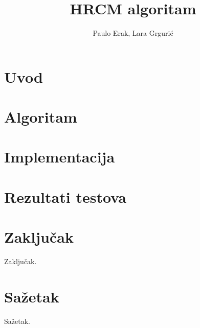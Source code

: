 \documentclass[times, utf8, seminar]{fer}
\begin{document}
\title{HRCM algoritam}

\author{Paulo Erak, Lara Grgurić}


\maketitle

\tableofcontents

\chapter{Uvod}


\chapter{Algoritam}


\chapter{Implementacija}


\chapter{Rezultati testova}


\chapter{Zaključak}
Zaključak.




\chapter{Sažetak}
Sažetak.
\end{document}
